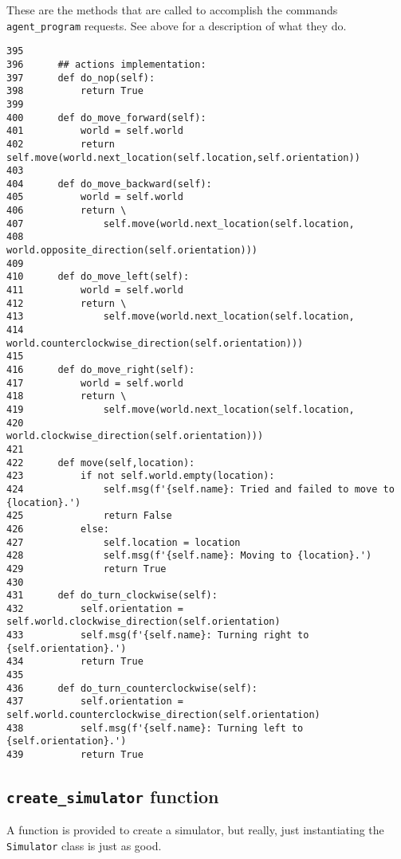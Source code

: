\documentclass[11pt]{tufte-handout}
\begin{document}
These are the methods that are called to accomplish the commands \texttt{agent\_program} requests.  See above for a description of what they do.

\begin{verbatim}
395  
396      ## actions implementation:
397      def do_nop(self):
398          return True
399  
400      def do_move_forward(self):
401          world = self.world
402          return self.move(world.next_location(self.location,self.orientation))
403  
404      def do_move_backward(self):
405          world = self.world
406          return \
407              self.move(world.next_location(self.location,
408                                            world.opposite_direction(self.orientation)))
409  
410      def do_move_left(self):
411          world = self.world
412          return \
413              self.move(world.next_location(self.location,
414                                            world.counterclockwise_direction(self.orientation)))
415  
416      def do_move_right(self):
417          world = self.world
418          return \
419              self.move(world.next_location(self.location,
420                                            world.clockwise_direction(self.orientation)))
421  
422      def move(self,location):
423          if not self.world.empty(location):
424              self.msg(f'{self.name}: Tried and failed to move to {location}.')
425              return False
426          else:
427              self.location = location
428              self.msg(f'{self.name}: Moving to {location}.')
429              return True
430  
431      def do_turn_clockwise(self):
432          self.orientation = self.world.clockwise_direction(self.orientation)
433          self.msg(f'{self.name}: Turning right to {self.orientation}.')
434          return True
435  
436      def do_turn_counterclockwise(self):
437          self.orientation = self.world.counterclockwise_direction(self.orientation)
438          self.msg(f'{self.name}: Turning left to {self.orientation}.')
439          return True
\end{verbatim}

\subsection{\texttt{create\_simulator} function}
\label{sec:org23cee2a}

A function is provided to create a simulator, but really, just instantiating the \texttt{Simulator} class is just as good.
\end{document}
